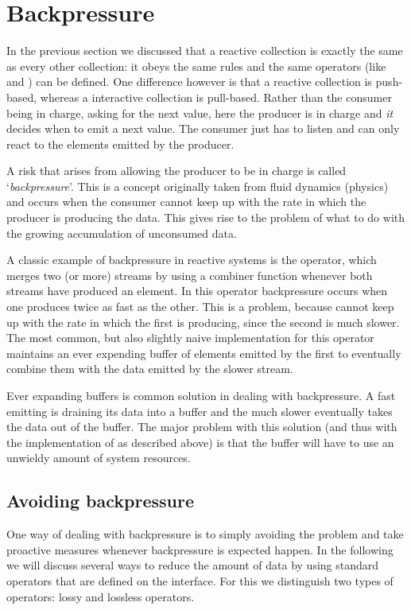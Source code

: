 
\section{Backpressure}
In the previous section we discussed that a reactive collection is exactly the same as every other collection: it obeys the same rules and the same operators (like  and ) can be defined. One difference however is that a reactive collection is push-based, whereas a interactive collection is pull-based. Rather than the consumer being in charge, asking for the next value, here the producer is in charge and \emph{it} decides when to emit a next value. The consumer just has to listen and can only react to the elements emitted by the producer.

A risk that arises from allowing the producer to be in charge is called `\textit{backpressure}'.  This is a concept originally taken from fluid dynamics (physics) and occurs when the consumer cannot keep up with the rate in which the producer is producing the data. This gives rise to the problem of what to do with the growing accumulation of unconsumed data.

A classic example of backpressure in reactive systems is the  operator, which merges two (or more) streams by using a combiner function whenever both streams have produced an element. In this operator backpressure occurs when one \obs produces twice as fast as the other. This is a problem, because  cannot keep up with the rate in which the first \obs is producing, since the second \obs is much slower. The most common, but also slightly naive implementation for this operator maintains an ever expending buffer of elements emitted by the first \obs to eventually combine them with the data emitted by the slower stream.

Ever expanding buffers is common solution in dealing with backpressure. A fast emitting \obs is draining its data into a buffer and the much slower \obv eventually takes the data out of the buffer. The major problem with this solution (and thus with the implementation of  as described above) is that the buffer will have to use an unwieldy amount of system resources.

\subsection{Avoiding backpressure}
One way of dealing with backpressure is to simply avoiding the problem and take proactive measures whenever backpressure is expected happen. In the following we will discuss several ways to reduce the amount of data by using standard operators that are defined on the \obs interface. For this we distinguish two types of operators: lossy and lossless operators. 

